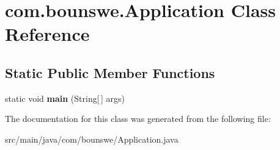 \hypertarget{classcom_1_1bounswe_1_1_application}{}\section{com.\+bounswe.\+Application Class Reference}
\label{classcom_1_1bounswe_1_1_application}
\subsection*{Static Public Member Functions}
\begin{DoxyCompactItemize}
\item 
\mbox{\label{classcom_1_1bounswe_1_1_application_a9cccb0b0b20e23993c2e82a30eb5de9d}} 
static void {\bfseries main} (String\mbox{[}$\,$\mbox{]} args)
\end{DoxyCompactItemize}


The documentation for this class was generated from the following file\+:\begin{DoxyCompactItemize}
\item 
src/main/java/com/bounswe/Application.\+java\end{DoxyCompactItemize}
